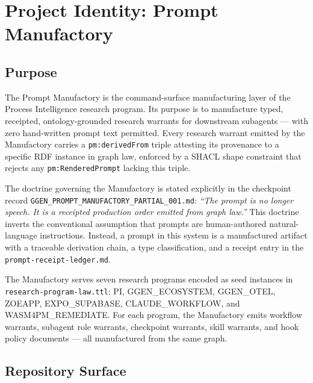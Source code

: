 
\section{Project Identity: Prompt Manufactory}
\label{sec:research-prompt-manufactory-identity}

\subsection{Purpose}
\label{sec:research-prompt-manufactory-identity-purpose}

The Prompt Manufactory is the command-surface manufacturing layer of the Process Intelligence
research program. Its purpose is to manufacture typed, receipted, ontology-grounded research
warrants for downstream subagents — with zero hand-written prompt text permitted. Every research
warrant emitted by the Manufactory carries a \texttt{pm:derivedFrom} triple attesting its
provenance to a specific RDF instance in graph law, enforced by a SHACL shape constraint that
rejects any \texttt{pm:RenderedPrompt} lacking this triple.

The doctrine governing the Manufactory is stated explicitly in the checkpoint record
\texttt{GGEN\_PROMPT\_MANUFACTORY\_PARTIAL\_001.md}: \textit{``The prompt is no longer speech.
It is a receipted production order emitted from graph law.''} This doctrine inverts the
conventional assumption that prompts are human-authored natural-language instructions. Instead,
a prompt in this system is a manufactured artifact with a traceable derivation chain, a type
classification, and a receipt entry in the \texttt{prompt-receipt-ledger.md}.

The Manufactory serves seven research programs encoded as seed instances in
\texttt{research-program-law.ttl}: PI, GGEN\_ECOSYSTEM, GGEN\_OTEL, ZOEAPP, EXPO\_SUPABASE,
CLAUDE\_WORKFLOW, and WASM4PM\_REMEDIATE. For each program, the Manufactory emits workflow
warrants, subagent role warrants, checkpoint warrants, skill warrants, and hook policy
documents --- all manufactured from the same graph.

\subsection{Repository Surface}
\label{sec:research-prompt-manufactory-identity-surface}

